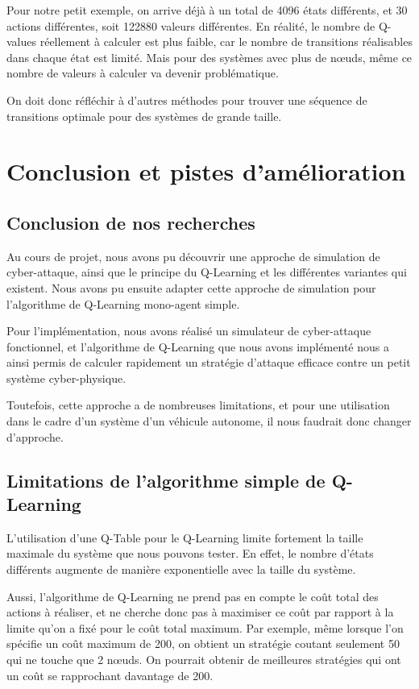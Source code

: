 \documentclass[a4paper]{article}
\begin{document}
    Pour notre petit exemple, on arrive déjà à un total de 4096 états différents, et 30 actions différentes, soit 122880 valeurs différentes.
    En réalité, le nombre de Q-values réellement à calculer est plus faible, car le nombre de transitions réalisables dans chaque état est limité.
    Mais pour des systèmes avec plus de n\oe uds, même ce nombre de valeurs à calculer va devenir problématique.

    On doit donc réfléchir à d'autres méthodes pour trouver une séquence de transitions optimale pour des systèmes de grande taille.

    \section{Conclusion et pistes d'amélioration}

    \subsection{Conclusion de nos recherches}

    Au cours de projet, nous avons pu découvrir une approche de simulation de cyber-attaque, ainsi que le principe du Q-Learning et les différentes variantes qui existent.
    Nous avons pu ensuite adapter cette approche de simulation pour l'algorithme de Q-Learning mono-agent simple.
    
    Pour l'implémentation, nous avons réalisé un simulateur de cyber-attaque fonctionnel, et l'algorithme de Q-Learning que nous avons implémenté nous a ainsi permis de calculer rapidement un stratégie d'attaque efficace contre un petit système cyber-physique.

    Toutefois, cette approche a de nombreuses limitations, et pour une utilisation dans le cadre d'un système d'un véhicule autonome, il nous faudrait donc changer d'approche.

    \subsection{Limitations de l'algorithme simple de Q-Learning}

    L'utilisation d'une Q-Table pour le Q-Learning limite fortement la taille maximale du système que nous pouvons tester.
    En effet, le nombre d'états différents augmente de manière exponentielle avec la taille du système.

    Aussi, l'algorithme de Q-Learning ne prend pas en compte le coût total des actions à réaliser, et ne cherche donc pas à maximiser ce coût par rapport à la limite qu'on a fixé pour le coût total maximum.
    Par exemple, même lorsque l'on spécifie un coût maximum de 200, on obtient un stratégie coutant seulement 50 qui ne touche que 2 n\oe uds.
    On pourrait obtenir de meilleures stratégies qui ont un coût se rapprochant davantage de 200.
\end{document}
